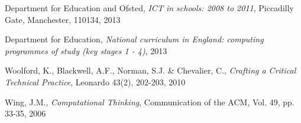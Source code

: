 \documentclass[11pt]{scrartcl}
\begin{document}
\begin{thebibliography}{9}
  Department for Education and Ofsted,
  \emph{ICT in schools: 2008 to 2011},
  Piccadilly Gate,
  Manchester,
  110134,
  2013

  Department for Education,
  \emph{National curriculum in England: computing programmes of study (key stages 1 - 4)},
  2013

  Woolford, K., Blackwell, A.F., Norman, S.J. \& Chevalier, C.,
  \emph{Crafting a Critical Technical Practice},
  Leonardo 43(2),
  202-203,
  2010

  Wing, J.M.,
  \emph{Computational Thinking},
  Communication of the ACM,
  Vol. 49, pp. 33-35,
  2006

\end{thebibliography}
\end{document}
